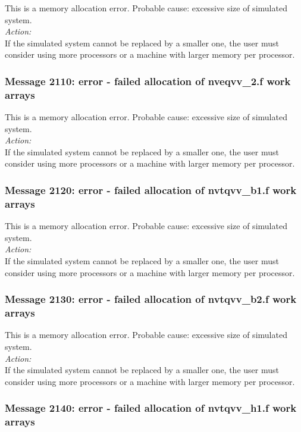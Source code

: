 This is a memory allocation error. Probable cause: excessive size of
simulated system. \\

\noindent
{\em Action:}\\
If the simulated system cannot be replaced by a smaller one, the user
must consider using more processors or a machine with larger memory
per processor.

\subsubsection*{Message 2110: error - failed allocation of nveqvv\_2.f
work arrays}

This is a memory allocation error. Probable cause: excessive size of
simulated system. \\

\noindent
{\em Action:}\\
If the simulated system cannot be replaced by a smaller one, the user
must consider using more processors or a machine with larger memory
per processor.

\subsubsection*{Message 2120: error - failed allocation of nvtqvv\_b1.f
work arrays}

This is a memory allocation error. Probable cause: excessive size of
simulated system. \\

\noindent
{\em Action:}\\
If the simulated system cannot be replaced by a smaller one, the user
must consider using more processors or a machine with larger memory
per processor.

\subsubsection*{Message 2130: error - failed allocation of nvtqvv\_b2.f
work arrays}

This is a memory allocation error. Probable cause: excessive size of
simulated system. \\

\noindent
{\em Action:}\\
If the simulated system cannot be replaced by a smaller one, the user
must consider using more processors or a machine with larger memory
per processor.

\subsubsection*{Message 2140: error - failed allocation of nvtqvv\_h1.f
work arrays}

